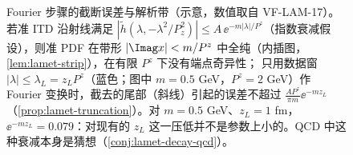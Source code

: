 \begin{figure}[htbp]
\caption{Fourier 步骤的截断误差与解析带（示意，数值取自 VF-LAM-17）。若准 ITD 沿射线满足 $|\tilde h(\lambda,-\lambda^2/P_z^2)|\le A\,\ee^{-m|\lambda|/P^z}$（指数衰减假设），则准 PDF 在带形 $|\Imag x|<m/P^z$ 中全纯（内插图，\cref{lem:lamet-strip}），在有限 $P^z$ 下没有端点奇异性；
只用数据窗 $|\lambda|\le\lambda_L=z_LP^z$（蓝色；图中 $m=0.5$ GeV，$P^z=2$ GeV）作 Fourier 变换时，截去的尾部（斜线）引起的误差不超过 $\frac{AP^z}{\pi m}\ee^{-mz_L}$（\cref{prop:lamet-truncation}）。对 $m=0.5$ GeV、$z_L=1$ fm，$\ee^{-mz_L}=0.079$：对现有的 $z_L$ 这一压低并不是参数上小的。QCD 中这种衰减本身是猜想（\cref{conj:lamet-decay-qcd}）。}
\label{fig:lamet-fourier}
\end{figure}

